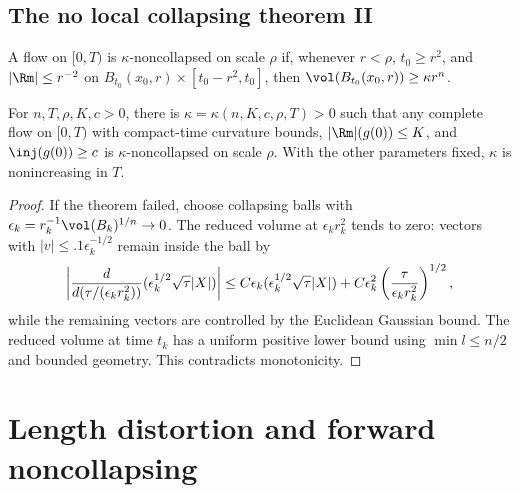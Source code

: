 \subsection{The no local collapsing theorem II} \label{I.7.3}
\begin{definition}
  \label{def:kl-no-local-collapsing-theorem-ii-kappa-noncollapsing}
  \leanok
  \label{noncollapsed2}
A flow on $[0,T)$ is $\kappa$-noncollapsed on scale $\rho$ if, whenever
$r<\rho$, $t_0\ge r^2$, and $|\Rm|\le r^{-2}$ on
$B_{t_0}(x_0,r)\times[t_0-r^2,t_0]$, then
$\vol(B_{t_0}(x_0,r))\ge\kappa r^n$.
\end{definition}

\begin{theorem}
  \label{thm:kl-no-local-collapsing-theorem-ii-existence-kappa-solutions}
  \label{nolocalcollapse}
For $n,T,\rho,K,c>0$, there is $\kappa=\kappa(n,K,c,\rho,T)>0$ such that any
complete flow on $[0,T)$ with compact-time curvature bounds,
$|\Rm|(g(0))\le K$, and $\inj(g(0))\ge c$ is $\kappa$-noncollapsed on scale $\rho$.
With the other parameters fixed, $\kappa$ is nonincreasing in $T$.
\end{theorem}
\begin{proof}
\sketch
If the theorem failed, choose collapsing balls with
$\epsilon_k=r_k^{-1}\vol(B_k)^{1/n}\to0$. The reduced volume at
$\epsilon_kr_k^2$ tends to zero: vectors with $|v|\le .1\epsilon_k^{-1/2}$ remain
inside the ball by
\begin{equation}\label{diffmess}
\left|{d\over d(\tau/(\epsilon_kr_k^2))}(\epsilon_k^{1/2}\sqrt\tau|X|)\right|
\le C\epsilon_k(\epsilon_k^{1/2}\sqrt\tau|X|)+C\epsilon_k^2\left({\tau\over\epsilon_kr_k^2}\right)^{1/2},
\end{equation}
while the remaining vectors are controlled by the Euclidean Gaussian bound.
The reduced volume at time $t_k$ has a uniform positive lower bound using
$\min l\le n/2$ and bounded geometry. This contradicts monotonicity.
\end{proof}

\section{Length distortion and forward noncollapsing}
